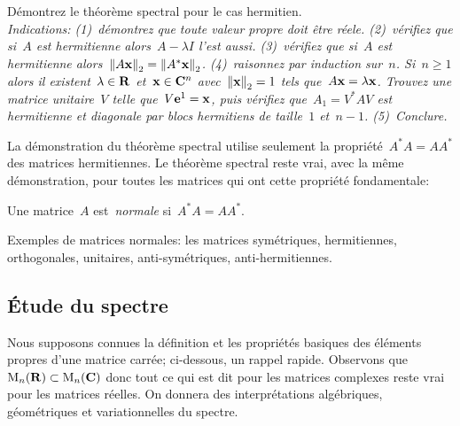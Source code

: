 \begin{exercice}
	Démontrez le théorème spectral pour le cas hermitien.\\
	\emph{
	Indications: (1)~démontrez que toute valeur propre doit être réele.
	(2)\!~vérifiez que si~$A$ est hermitienne alors~$A-\lambda I$ l'est aussi.
	(3)\!~vérifiez que si~$A$ est hermitienne
	alors~$\left\|A\mathbf{x}\right\|_2=\left\|A^*\mathbf{x}\right\|_2$.
	(4)\!~raisonnez par induction sur~$n$.  Si~$n\ge 1$ alors il
	existent~$\lambda\in\mathbf{R}$ et~$\mathbf{x}\in\mathbf{C}^n$ avec~$\left\|\mathbf{x}\right\|_2=1$ tels
	que~$A\mathbf{x}=\lambda\mathbf{x}$.  Trouvez une matrice unitaire~$V$ telle
	que~$V\mathbf{e}^1=\mathbf{x}$, puis vérifiez que~$A_1=V^*AV$ est hermitienne et diagonale
	par blocs hermitiens de taille~$1$ et~$n-1$.
	(5)\!\!~Conclure.
}
\end{exercice}

La démonstration du théorème spectral utilise seulement la
propriété~$A^*A=AA^*$ des matrices hermitiennes.  Le théorème spectral reste
vrai, avec la même démonstration, pour toutes les matrices qui ont cette
propriété fondamentale:

\begin{definition}
	Une matrice~$A$ est~\emph{normale} si~$A^*A=AA^*$.
\end{definition}

Exemples de matrices normales: les matrices symétriques,
hermitiennes, orthogonales, unitaires, anti-symétriques, anti-hermitiennes.




%

\subsection{Étude du spectre}

Nous supposons connues la définition et les propriétés basiques des éléments
propres d'une matrice carrée; ci-dessous, un rappel rapide.  Observons
que~$\mathrm{M}_n(\mathbf{R})\subset \mathrm{M}_n(\mathbf{C})$ donc tout ce qui est dit pour les matrices
complexes reste vrai pour les matrices réelles.
On donnera des interprétations algébriques, géométriques et variationnelles
du spectre.

